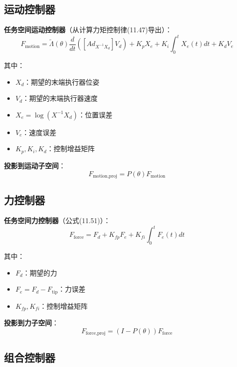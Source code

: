 \documentclass[12pt,a4paper]{article}
\begin{document}
\subsection{运动控制器}

\textbf{任务空间运动控制器}（从计算力矩控制律(11.47)导出）：
\begin{equation}
F_{\text{motion}} = \tilde{\Lambda}(\theta)\frac{d}{dt}([Ad_{X^{-1}X_d}]V_d) + K_p X_e + K_i\int_0^t X_e(t)dt + K_d V_e
\end{equation}

其中：
\begin{itemize}
\item $X_d$：期望的末端执行器位姿
\item $V_d$：期望的末端执行器速度
\item $X_e = \log(X^{-1}X_d)$：位置误差
\item $V_e$：速度误差
\item $K_p, K_i, K_d$：控制增益矩阵
\end{itemize}

\textbf{投影到运动子空间}：
\begin{equation}
F_{\text{motion,proj}} = P(\theta)F_{\text{motion}}
\end{equation}

\subsection{力控制器}

\textbf{任务空间力控制器}（公式(11.51)）：
\begin{equation}
F_{\text{force}} = F_d + K_{fp}F_e + K_{fi}\int_0^t F_e(t)dt
\end{equation}

其中：
\begin{itemize}
\item $F_d$：期望的力
\item $F_e = F_d - F_{\text{tip}}$：力误差
\item $K_{fp}, K_{fi}$：控制增益矩阵
\end{itemize}

\textbf{投影到力子空间}：
\begin{equation}
F_{\text{force,proj}} = (I - P(\theta))F_{\text{force}}
\end{equation}

\subsection{组合控制器}
\end{document}
